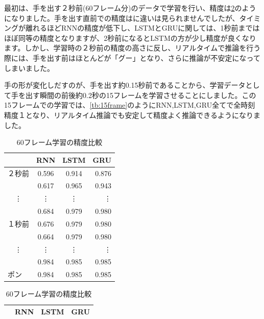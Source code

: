 最初は、手を出す２秒前(60フレーム分)のデータで学習を行い、精度は\ref{tb:60frame}のようになりました。手を出す直前での精度はに違いは見られませんでしたが、タイミングが離れるほどRNNの精度が低下し、LSTMとGRUに関しては、1秒前まではほぼ同等の精度となりますが、2秒前になるとLSTMの方が少し精度が良くなります。しかし、学習時の２秒前の精度の高さに反し、リアルタイムで推論を行う際には、手を出す前はほとんどが「グー」となり、さらに推論が不安定になってしまいました。

手の形が変化しだすのが、手を出す約0.15秒前であることから、学習データとして手を出す瞬間の前後約0.2秒の15フレームを学習させることにしました。この15フレームでの学習では、\ref{tb:15frame}のようにRNN,LSTM,GRU全てで全時刻精度１となり、リアルタイム推論でも安定して精度よく推論できるようになりました。

\begin{table}[h]
       \hspace{0.1\textwidth}%
       \begin{subtable}{0.3\textwidth}
           \centering
           \begin{tabular}{l||c|c|r}
              & RNN & LSTM & GRU \\ \hline\hline
              ２秒前 & 0.596 & 0.914 & 0.876 \\ \hline
               & 0.617 & 0.965 & 0.943 \\ \hline
              　\vdots & \vdots & \vdots & \vdots \\ \hline
               & 0.684 & 0.979 & 0.980 \\ \hline
              １秒前 & 0.676 & 0.979 & 0.980 \\ \hline
               & 0.664 & 0.979 & 0.980 \\ \hline
              　\vdots & \vdots & \vdots & \vdots \\ \hline
               & 0.984 & 0.985 & 0.985 \\ \hline
              ポン & 0.984 & 0.985 & 0.985 \\ \hline
           \end{tabular}
           \caption{60フレーム学習の精度比較}
           \label{tb:60frame}
       \end{subtable}%
       \hspace{0.1\textwidth}%
       \begin{subtable}{0.3\textwidth}
           \centering
           \begin{tabular}{l||c|c|r}
              & RNN & LSTM & GRU \\ \hline\hline

\end{tabular}
\end{subtable}
\end{table}
